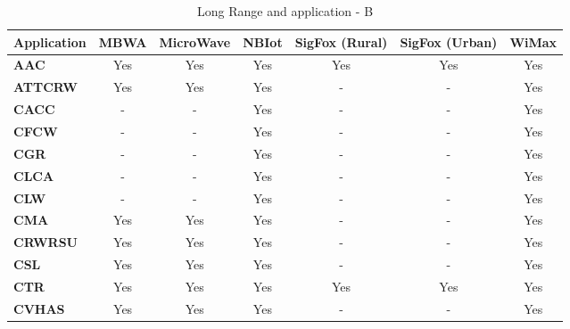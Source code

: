 \FloatBarrier
\begin{table}[ht!]
\centering
\caption{Long Range and application - B}
\begin{tabular}{lcccccc}
\hline
\textbf{Application} & \textbf{MBWA} & \textbf{MicroWave} & \textbf{NBIot} & \textbf{SigFox (Rural)} & \textbf{SigFox (Urban)} & \textbf{WiMax} \\
\hline
\textbf{AAC}         & Yes           & Yes                & Yes            & Yes                     & Yes                     & Yes            \\
\textbf{ATTCRW}      & Yes           & Yes                & Yes            & -                       & -                       & Yes            \\
\textbf{CACC}        & -             & -                  & Yes            & -                       & -                       & Yes            \\
\textbf{CFCW}        & -             & -                  & Yes            & -                       & -                       & Yes            \\
\textbf{CGR}         & -             & -                  & Yes            & -                       & -                       & Yes            \\
\textbf{CLCA}        & -             & -                  & Yes            & -                       & -                       & Yes            \\
\textbf{CLW}         & -             & -                  & Yes            & -                       & -                       & Yes            \\
\textbf{CMA}         & Yes           & Yes                & Yes            & -                       & -                       & Yes            \\
\textbf{CRWRSU}      & Yes           & Yes                & Yes            & -                       & -                       & Yes            \\
\textbf{CSL}         & Yes           & Yes                & Yes            & -                       & -                       & Yes            \\
\textbf{CTR}         & Yes           & Yes                & Yes            & Yes                     & Yes                     & Yes            \\
\textbf{CVHAS}       & Yes           & Yes                & Yes            & -                       & -                       & Yes            \\

\end{tabular}
\end{table}
